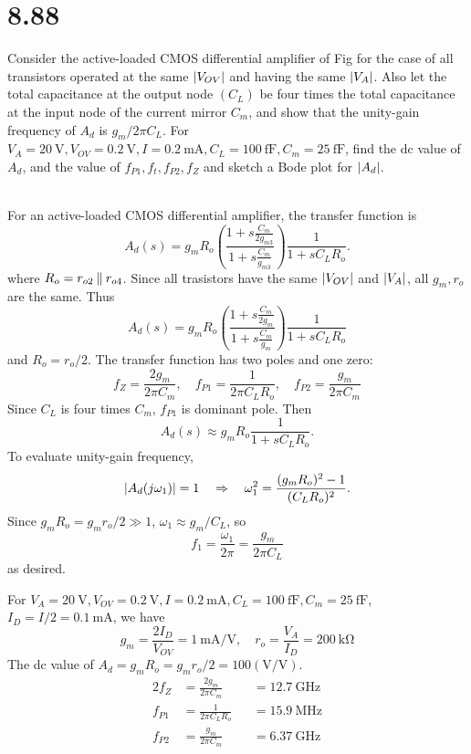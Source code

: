 \documentclass[12pt, a4paper]{article}
\begin{document}
\section{8.88}
Consider the active-loaded CMOS differential amplifier of Fig for
the case of all transistors operated at the same $\lvert V_{OV}\rvert$ and having
the same $\lvert V_A\rvert$. Also let the total capacitance at the output node
$(C_L)$ be four times the total capacitance at the input node of the
current mirror $C_m$, and show that the unity-gain frequency of $A_d$ is
$g_m/2\pi C_L$. For $V_A=\SI{20}{\V}, V_{OV}=\SI{0.2}{\V}, I=\SI{0.2}{\mA},
C_L=\SI{100}{\fF},C_m=\SI{25}{\fF}$, find the dc value of $A_d$, and the
value of $f_{P1}, f_t, f_{P2}, f_Z$ and sketch a Bode plot for $\lvert A_d\rvert$.

\Ans \\
For an active-loaded CMOS differential amplifier, the transfer function is
\[
  A_d(s) = g_mR_o\left(\frac{1+s\frac{C_m}{2g_{m3}}}{1+s\frac{C_m}{g_{m3}}}\right)
      \frac{1}{1+sC_LR_o}.
\]
where $R_o = r_{o2} \mathbin{\|} r_{o4}$.
Since all trasistors have the same $\lvert V_{OV}\rvert$ and $\lvert V_A\rvert$, all
$g_m, r_o$ are the same. Thus
\[
  A_d(s) = g_mR_o\left(\frac{1+s\frac{C_m}{2g_m}}{1+s\frac{C_m}{g_m}}\right)
      \frac{1}{1+sC_LR_o}
\]
and $R_o = r_o / 2$. The transfer function has two poles and one zero:
\[
  f_Z = \frac{2g_m}{2\pi C_m}, \quad
  f_{P1} = \frac{1}{2\pi C_LR_o}, \quad
  f_{P2} = \frac{g_m}{2\pi C_m}
\]
Since $C_L$ is four times $C_m$, $f_{P1}$ is dominant pole. Then
\[
  A_d(s) \approx g_mR_o \frac{1}{1+sC_LR_o}.
\]
To evaluate unity-gain frequency,
\[
  \lvert A_d(j\omega_1)\rvert = 1 \quad \Rightarrow \quad
  \omega_1^2 = \frac{(g_mR_o)^2 - 1}{(C_LR_o)^2}.
\]
Since $g_mR_o = g_mr_o/2 \gg 1$, $\omega_1 \approx g_m/C_L$, so
\[
  f_1 = \frac{\omega_1}{2\pi} = \frac{g_m}{2\pi C_L}
\]
as desired.

For $V_A=\SI{20}{\V}, V_{OV}=\SI{0.2}{\V}, I=\SI{0.2}{\mA},
C_L=\SI{100}{\fF},C_m=\SI{25}{\fF}$, $I_D = I/2=\SI{0.1}{\mA}$, we have
\[
  g_m = \frac{2I_D}{V_{OV}} = \SI{1}{\mA/\V}, \quad
  r_o = \frac{V_A}{I_D} = \SI{200}{\kohm}
\]
The dc value of $A_d = g_mR_o = g_mr_o/2 = 100(\si{\V/\V})$.
\begin{alignat*}{2}
  f_Z &= \frac{2g_m}{2\pi C_m} & &= \SI{12.7}{\GHz} \\
  f_{P1} &= \frac{1}{2\pi C_LR_o} & &= \SI{15.9}{\MHz} \\
  f_{P2} &= \frac{g_m}{2\pi C_m} & &= \SI{6.37}{\GHz}
\end{alignat*}
\end{document}
